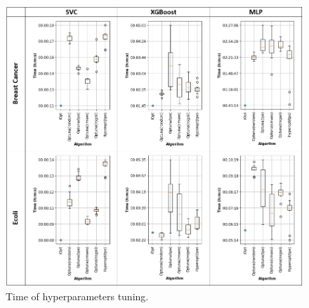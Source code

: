 \documentclass[preprint,12pt]{elsarticle}
\begin{document}


\begin{figure}
\centering
\includegraphics[width=\textwidth]{fig_time}
\caption{Time of hyperparameters tuning.} \label{fig8}
\end{figure}
\end{document}
